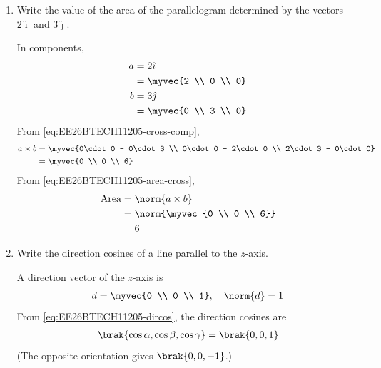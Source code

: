 \begin{enumerate}[label=\thesubsection.\arabic*, ref=\thesubsection.\theenumi, itemsep=3ex]
\item
Write the value of the area of the parallelogram determined by the vectors $2\hat{\imath}$ and $3\hat{\jmath}$.

\medskip
\solution In components,
\begin{align}
	\vec{a} &= 2\hat{\imath} \notag
	\\
	&= \myvec{2 \\ 0 \\ 0}
	\\
	\vec{b} &= 3\hat{\jmath} \notag
	\\
	&= \myvec{0 \\ 3 \\ 0}
\end{align}
From \eqref{eq:EE26BTECH11205-cross-comp},
\begin{align}
	\vec{a}\times\vec{b} &= \myvec{0\cdot 0 - 0\cdot 3 \\ 0\cdot 0 - 2\cdot 0 \\ 2\cdot 3 - 0\cdot 0} \notag
	\\
	&= \myvec{0 \\ 0 \\ 6}
\end{align}
From \eqref{eq:EE26BTECH11205-area-cross},
\begin{align}
	\text{Area} &= \norm{\vec{a}\times\vec{b}} \notag
	\\
	&= \norm{\myvec{0 \\ 0 \\ 6}} \notag
	\\
	&= 6
\end{align}

\item
Write the direction cosines of a line parallel to the $z$-axis.

\medskip
\solution A direction vector of the $z$-axis is
\begin{align}
	\vec{d} = \myvec{0 \\ 0 \\ 1}, \quad \norm{\vec{d}} = 1
\end{align}
From \eqref{eq:EE26BTECH11205-dircos}, the direction cosines are
\begin{align}
	\brak{\cos\alpha,\cos\beta,\cos\gamma} = \brak{0,0,1}
\end{align}
(The opposite orientation gives $\brak{0,0,-1}$.)


\end{enumerate}
